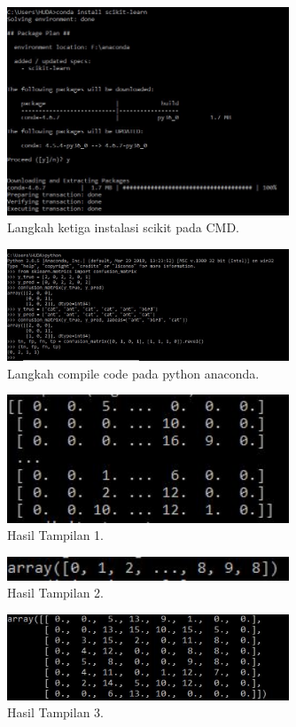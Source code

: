 \begin{figure}[ht]\centerline{\includegraphics[width=0.75\textwidth]{figures/8.JPG}}\caption{Langkah ketiga instalasi scikit pada CMD.}\end{figure}
\begin{figure}[ht]\centerline{\includegraphics[width=0.75\textwidth]{figures/9.JPG}}\caption{Langkah compile code pada python anaconda.}\end{figure}
\begin{figure}[ht]\centerline{\includegraphics[width=0.75\textwidth]{figures/10.JPG}}\caption{Hasil Tampilan 1.}\end{figure}
\begin{figure}[ht]\centerline{\includegraphics[width=0.75\textwidth]{figures/11.JPG}}\caption{Hasil Tampilan 2.}\end{figure}
\begin{figure}[ht]\centerline{\includegraphics[width=0.75\textwidth]{figures/12.JPG}}\caption{Hasil Tampilan 3.}\end{figure}
